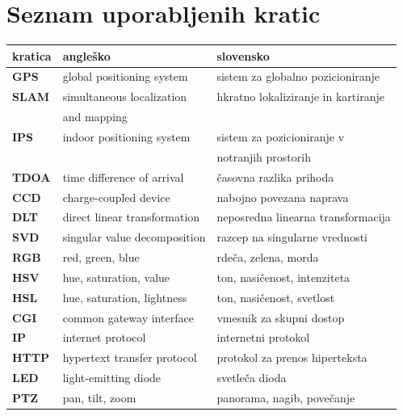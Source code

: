 \documentclass[a4paper, 12pt]{book}
\newcommand{\clearemptydoublepage}{\newpage{\pagestyle{empty}\cleardoublepage}}
\begin{document}
\clearemptydoublepage


\chapter*{Seznam uporabljenih kratic}

\begin{tabular}{l|l|l}
  {\bf kratica} & {\bf angleško} & {\bf slovensko} \\ \hline
  {\bf GPS} & global positioning system & sistem za globalno pozicioniranje \\
  {\bf SLAM} & simultaneous localization & hkratno lokaliziranje in kartiranje \\
            & and mapping & \\
  {\bf IPS} & indoor positioning system & sistem za pozicioniranje v \\
  			& 							& notranjih prostorih \\
  {\bf TDOA} & time difference of arrival & časovna razlika prihoda \\
  {\bf CCD} & charge-coupled device & nabojno povezana naprava \\
  {\bf DLT} & direct linear transformation & neposredna linearna transformacija \\
  {\bf SVD} & singular value decomposition & razcep na singularne vrednosti \\
  {\bf RGB} & red, green, blue & rdeča, zelena, morda \\
  {\bf HSV} & hue, saturation, value & ton, nasičenost, intenziteta \\
  {\bf HSL} & hue, saturation, lightness & ton, nasičenost, svetlost \\
  {\bf CGI} & common gateway interface & vmesnik za skupni dostop \\
  {\bf IP} & internet protocol & internetni protokol \\
  {\bf HTTP} & hypertext transfer protocol & protokol za prenos hiperteksta \\
  {\bf LED} & light-emitting diode & svetleča dioda \\
  {\bf PTZ} & pan, tilt, zoom & panorama, nagib, povečanje \\
\end{tabular}
\end{document}
